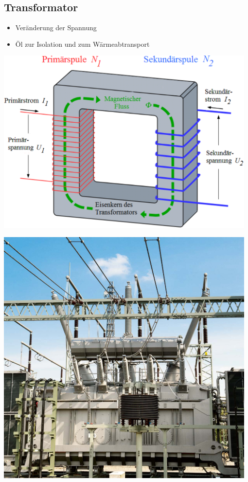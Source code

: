 \subsection{Transformator}

\begin{itemize}
    \item Veränderung der Spannung
    \item Öl zur Isolation und zum Wärmeabtransport
\end{itemize}

\begin{minipage}[c]{0.58\columnwidth}
    \begin{center}
        \includegraphics[width=0.98\textwidth, align=c]{images/Transformator_1.png}
    \end{center}
\end{minipage}
\hfill
\begin{minipage}[c]{0.38\columnwidth}
    \begin{center}
        \includegraphics[width=0.98\textwidth, align=c]{images/Transformator_2.png}
    \end{center}
\end{minipage}


